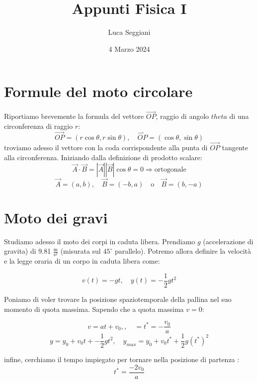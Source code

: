 \documentclass[a4paper,12pt]{article}
\title{Appunti Fisica I}
\author{Luca Seggiani}
\date{4 Marzo 2024}
\begin{document}
\maketitle
\section{Formule del moto circolare}
Riportiamo brevemente la formula del vettore $\vec{OP}$, raggio di angolo $theta$ di una circonferenza
di raggio $r$:
$$ \vec{OP} = (r\cos{\theta}, r\sin{\theta}), \quad \hat{OP} = (\cos{\theta}, \sin{\theta}) $$
troviamo adesso il vettore con la coda corrispondente alla punta di $\vec{OP}$ tangente alla circonferenza.
Iniziando dalla definizione di prodotto scalare:
$$ \vec{A} \cdot \vec{B} = |\vec{A}||\vec{B}|\cos{\theta} = 0 \Rightarrow \mathrm{ortogonale} $$
$$ \vec{A} = (a, b), \quad \vec{B} = (-b, a) \quad \mathrm{o} \quad \vec{B} = (b, -a) $$

\section{Moto dei gravi}
Studiamo adesso il moto dei corpi in caduta libera. Prendiamo $g$ (accelerazione di gravita) di 9.81 $\frac{\mathrm{m}}{\mathrm{s^2}}$
(misurata sul $45^\circ$ parallelo). Potremo allora definire la velocità e la legge oraria di un corpo in caduta
libera come:

$$ v(t) = -gt, \quad y(t) = -\frac{1}{2}gt^2 $$ 

Poniamo di voler trovare la posizione spaziotemporale della pallina nel suo momento di quota massima. Sapendo
che a quota massima $v = 0$:

$$ v = at + v_0,, \quad = t^* = -\frac{v_0}{a} $$
$$ y = y_0 + v_0t + -\frac{1}{2}gt^2, \quad y_{max} = y_0 + v_0t^* + \frac{1}{2}g(t^*)^2 $$

infine, cerchiamo il tempo impiegato per tornare nella posizione di partenza :
$$ t^* = \frac{-2v_0}{a} $$ 
\end{document}
